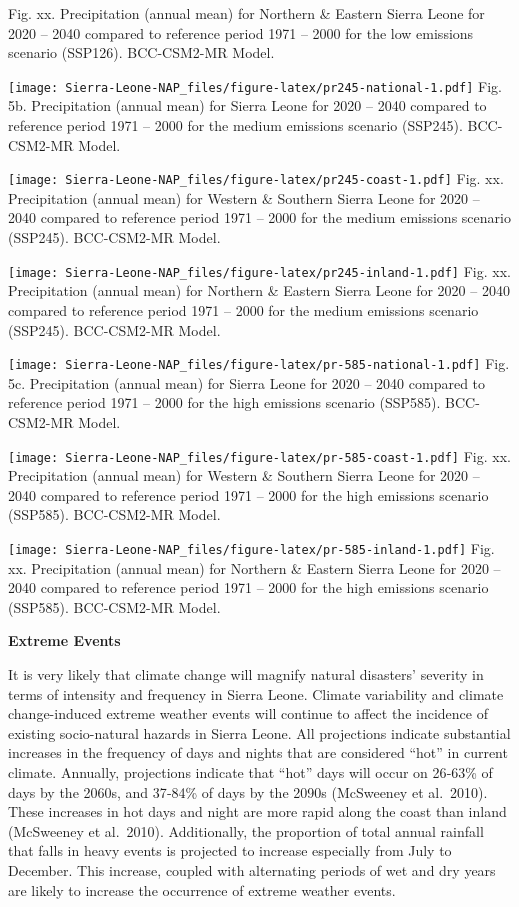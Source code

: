 \documentclass[
]{book}
\begin{document}
Fig. xx. Precipitation (annual mean) for Northern \& Eastern Sierra Leone for 2020 -- 2040 compared to reference period 1971 -- 2000 for the low emissions scenario (SSP126). BCC-CSM2-MR Model.

\texttt{[image: Sierra-Leone-NAP\_files/figure-latex/pr245-national-1.pdf]}
Fig. 5b. Precipitation (annual mean) for Sierra Leone for 2020 -- 2040 compared to reference period 1971 -- 2000 for the medium emissions scenario (SSP245). BCC-CSM2-MR Model.

\texttt{[image: Sierra-Leone-NAP\_files/figure-latex/pr245-coast-1.pdf]}
Fig. xx. Precipitation (annual mean) for Western \& Southern Sierra Leone for 2020 -- 2040 compared to reference period 1971 -- 2000 for the medium emissions scenario (SSP245). BCC-CSM2-MR Model.

\texttt{[image: Sierra-Leone-NAP\_files/figure-latex/pr245-inland-1.pdf]}
Fig. xx. Precipitation (annual mean) for Northern \& Eastern Sierra Leone for 2020 -- 2040 compared to reference period 1971 -- 2000 for the medium emissions scenario (SSP245). BCC-CSM2-MR Model.

\texttt{[image: Sierra-Leone-NAP\_files/figure-latex/pr-585-national-1.pdf]}
Fig. 5c. Precipitation (annual mean) for Sierra Leone for 2020 -- 2040 compared to reference period 1971 -- 2000 for the high emissions scenario (SSP585). BCC-CSM2-MR Model.

\texttt{[image: Sierra-Leone-NAP\_files/figure-latex/pr-585-coast-1.pdf]}
Fig. xx. Precipitation (annual mean) for Western \& Southern Sierra Leone for 2020 -- 2040 compared to reference period 1971 -- 2000 for the high emissions scenario (SSP585). BCC-CSM2-MR Model.

\texttt{[image: Sierra-Leone-NAP\_files/figure-latex/pr-585-inland-1.pdf]}
Fig. xx. Precipitation (annual mean) for Northern \& Eastern Sierra Leone for 2020 -- 2040 compared to reference period 1971 -- 2000 for the high emissions scenario (SSP585). BCC-CSM2-MR Model.

\textbf{Extreme Events}

It is very likely that climate change will magnify natural disasters' severity in terms of intensity and frequency in Sierra Leone. Climate variability and climate change-induced extreme weather events will continue to affect the incidence of existing socio-natural hazards in Sierra Leone. All projections indicate substantial increases in the frequency of days and nights that are considered ``hot'' in current climate. Annually, projections indicate that ``hot'' days will occur on 26‐63\% of days by the 2060s, and 37‐84\% of days by the 2090s (McSweeney et al.~2010). These increases in hot days and night are more rapid along the coast than inland (McSweeney et al.~2010). Additionally, the proportion of total annual rainfall that falls in heavy events is projected to increase especially from July to December. This increase, coupled with alternating periods of wet and dry years are likely to increase the occurrence of extreme weather events.
\end{document}
